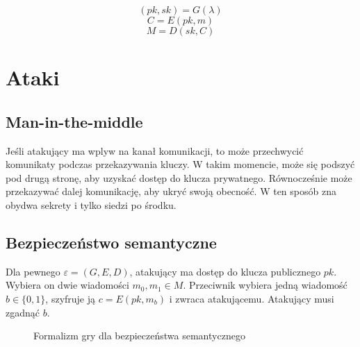 \documentclass{../notatki}
\begin{document}
$$
(pk, sk) = G(\lambda)
$$
$$
C = E(pk, m)
$$
$$
M = D(sk, C)
$$

\section{Ataki}

\subsection{Man-in-the-middle}

Jeśli atakujący ma wplyw na kanał komunikacji, to może przechwycić komunikaty
podczas przekazywania kluczy. W takim momencie, może się podszyć pod drugą
stronę, aby uzyskać dostęp do klucza prywatnego. Równocześnie może
przekazywać dalej komunikację, aby ukryć swoją obecność. W ten sposób
zna obydwa sekrety i tylko siedzi po środku.

\subsection{Bezpieczeństwo semantyczne}

Dla pewnego $\varepsilon = (G, E, D)$, atakujący ma dostęp do klucza
publicznego $pk$. Wybiera on dwie wiadomości $m_0, m_1 \in M$. Przeciwnik
wybiera jedną wiadomość $b \in \{0, 1\}$, szyfruje ją $c = E(pk, m_b)$ i zwraca
atakującemu. Atakujący musi zgadnąć $b$.

\begin{figure}[H]
  \centering
  \caption{Formalizm gry dla bezpieczeństwa semantycznego}
\end{figure}
\end{document}
